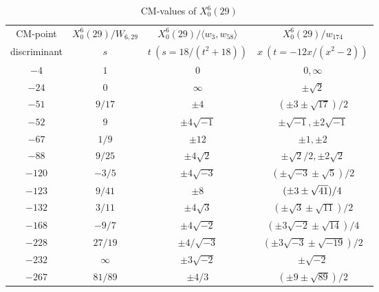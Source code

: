 \documentclass{amsart}
\theoremstyle{definition}
\begin{document}
\begin{appendices}
\begin{table}
\renewcommand{\arraystretch}{1.5}
\tabcolsep=10pt                         
\begin{tabular}{|c|c|c|c|}
\hline
CM-point& $X_{0}^{6}\left( 29\right) /W_{6,29}$ & $X_{0}^{6}\left( 29\right) /\langle w_3,w_{58}\rangle$ & $%
X_{0}^{6}\left( 29\right) /w_{174}$ \\ 
discriminant & $s$ & $t\ (s={18}/(t^2+18))$ & $x\ (t={-12x}/(x^2-2))$ \\ \hline
${-4}$ & $1$ & $0$ & $0,\infty$ \\ 
${-24}$ & $0$ & $\infty $ & $\pm \sqrt{2}$ \\ 
${-51}$ & ${9}/{17}$ & $\pm4$ & $(\pm 3\pm \sqrt{17})/{2}$
\\ 
${-52}$ & $9$ & $\pm4\sqrt{-1}$ & $\pm \sqrt{-1},\pm 2\sqrt{-1}$ \\ 
${-67}$ & ${1}/{9}$ & $\pm 12$ & $\pm 1,\pm 2$ \\ 
${-88}$ & ${9}/{25}$ & $\pm4\sqrt{2}$ & $\pm{ \sqrt{2}%
}/{2},\pm 2\sqrt{2}$ \\
${-120}$ & $-{3}/{5}$ & $\pm4\sqrt{-3}$ & $(\pm\sqrt{-3}\pm\sqrt{5})/{2}$ \\ 
${-123}$ & ${9}/{41}$ & $\pm8$ & $(\pm 3\pm \sqrt{41})/{%
4}$ \\ 
${-132}$ & ${3}/{11}$ & $\pm4\sqrt{3}$ & $(\pm\sqrt{3}\pm\sqrt{11})/{2}$ \\
${-168}$ & $-{9}/{7}$ & $\pm4\sqrt{-2}$ & $(\pm 3\sqrt{-2}\pm\sqrt{14})/{4}$ \\ 
${-228}$ & ${27}/{19}$ & $\pm{ 4/\sqrt{-3}}$ & $(\pm 3\sqrt{-3}\pm\sqrt{-19})/{2}$ \\ 
${-232}$ & $\infty $ & $\pm 3\sqrt{-2}$ & $\pm \sqrt{-2}$ \\
${-267}$ & ${81}/{89}$ & $\pm{4}/{3}$ & $(\pm 9\pm \sqrt{89})/{2}$ \\ \hline
\end{tabular}
\bigskip
\caption{CM-values of $X^{6}_0(29)$}
\end{table}


\end{appendices}
\end{document}

